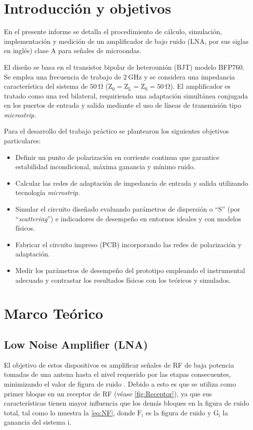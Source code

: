 \documentclass{article}
\begin{document}
\section{Introducción y objetivos} \label{section:sec_1}
En el presente informe se detalla el procedimiento de cálculo, simulación, implementación y medición de un amplificador de bajo ruido (LNA, por sus siglas en inglés) clase A para señales de microondas. 

El diseño se basa en el transistor bipolar de heterounión (BJT) modelo BFP760. Se emplea una frecuencia de trabajo de $\mathrm{2 \ GHz}$ y se considera una impedancia característica del sistema de $\mathrm{50 \ \Omega}$ ($\mathrm{Z_{0} = Z_{L} = Z_{S} = 50 \ \Omega}$). El amplificador es tratado como una red bilateral, requiriendo una adaptación simultánea conjugada en los puertos de entrada y salida mediante el uso de líneas de transmisión tipo \textit{microstrip}.

Para el desarrollo del trabajo práctico se plantearon los siguientes objetivos particulares:
\begin{itemize}
    \item Definir un punto de polarización en corriente continua que garantice estabilidad incondicional, máxima ganancia y mínimo ruido.
    \item Calcular las redes de adaptación de impedancia de entrada y salida utilizando tecnología \textit{microstrip}.
    \item Simular el circuito diseñado evaluando parámetros de dispersión o ``$\mathrm{S}$'' (por ``\textit{scattering}'') e indicadores de desempeño en entornos ideales y con modelos físicos.
    \item Fabricar el circuito impreso (PCB) incorporando las redes de polarización y adaptación.
    \item Medir los parámetros de desempeño del prototipo empleando el instrumental adecuado y contrastar los resultados físicos con los teóricos y simulados.
\end{itemize}

\newpage

\section{Marco Teórico} \label{sec_2}
\subsection{Low Noise Amplifier (LNA)} \label{section:sec_2.1}
El objetivo de estos dispositivos es amplificar señales de RF de baja potencia tomadas de una antena hasta el nivel requerido por las etapas consecuentes, minimizando el valor de figura de ruido \cite{bose_lna}. Debido a esto es que se utiliza como primer bloque en un receptor de RF (véase \autoref{fig:Receptor}), ya que sus características tienen mayor influencia que los demás bloques en la figura de ruido total, tal como lo muestra la \autoref{eq:NF}, donde $\mathrm{F_{i}}$ es la figura de ruido y $\mathrm{G_{i}}$ la ganancia del sistema $\mathrm{i}$.
\end{document}
